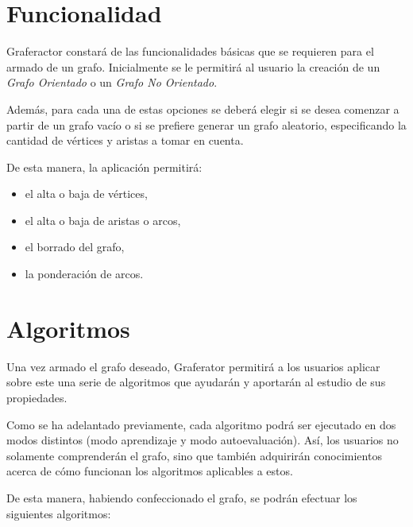 \documentclass{book}
\begin{document}
\section{Funcionalidad}

Graferactor constará de las funcionalidades básicas que se requieren para el armado de un grafo. Inicialmente se le permitirá al usuario la creación de un \textit{Grafo Orientado} o un \textit{Grafo No Orientado}. 
\par
Además, para cada una de estas opciones se deberá elegir si se desea comenzar a partir de un grafo vacío o si se prefiere generar un grafo aleatorio, especificando la cantidad de vértices y aristas a tomar en cuenta.
\par
De esta manera, la aplicación permitirá:
\medskip

	\begin{itemize}
		\renewcommand{\labelitemi}{\scriptsize\tiny$\blacksquare$} 
		\itemsep=2pt \topsep=0pt \partopsep=0pt \parskip=0pt \parsep=0pt
		
		\item el alta o baja de vértices,

		\item el alta o baja de aristas o arcos,

		\item el borrado del grafo,

		\item la ponderación de arcos.

	\end{itemize}
	\medskip


\section{Algoritmos}

Una vez armado el grafo deseado, Graferator permitirá a los usuarios aplicar sobre este una serie de algoritmos que ayudarán y aportarán al estudio de sus propiedades.
\par
Como se ha adelantado previamente, cada algoritmo podrá ser ejecutado en dos modos distintos (modo aprendizaje y modo autoevaluación). Así, los usuarios no solamente comprenderán el grafo, sino que también adquirirán conocimientos acerca de cómo funcionan los algoritmos aplicables a estos.
\par
De esta manera, habiendo confeccionado el grafo, se podrán efectuar los siguientes algoritmos:
\end{document}
